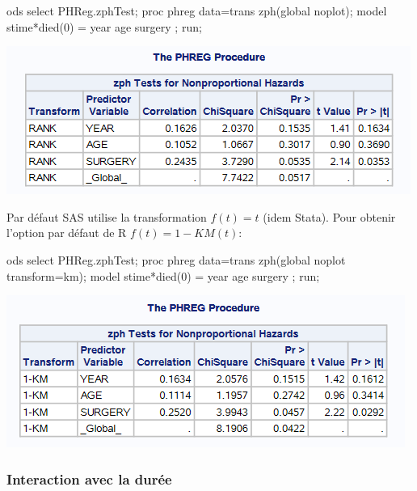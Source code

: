 \documentclass[
  12pt,
  letterpaper,
  DIV=11,
  numbers=noendperiod,
  onepage,
  openany]{scrreprt}
\newenvironment{Shaded}{\begin{snugshade}}{\end{snugshade}}
\newcommand{\AttributeTok}[1]{\textcolor[rgb]{0.80,0.80,0.80}{#1}}
\newcommand{\DecValTok}[1]{\textcolor[rgb]{0.86,0.86,0.80}{#1}}
\newcommand{\FunctionTok}[1]{\textcolor[rgb]{0.94,0.94,0.56}{#1}}
\newcommand{\NormalTok}[1]{\textcolor[rgb]{0.80,0.80,0.80}{#1}}
\newcommand{\OtherTok}[1]{\textcolor[rgb]{0.94,0.94,0.56}{#1}}
\newcommand{\SpecialCharTok}[1]{\textcolor[rgb]{0.86,0.64,0.64}{#1}}
\begin{document}
\begin{Shaded}
\begin{Highlighting}[]
\NormalTok{ods select PHReg.zphTest;}
\NormalTok{proc phreg data}\OtherTok{=}\NormalTok{trans }\FunctionTok{zph}\NormalTok{(global noplot);}
\NormalTok{model stime}\SpecialCharTok{*}\FunctionTok{died}\NormalTok{(}\DecValTok{0}\NormalTok{) }\OtherTok{=}\NormalTok{ year age surgery ;}
\NormalTok{run;}
\end{Highlighting}
\end{Shaded}

\includegraphics{sas/5b.PNG}

Par défaut SAS utilise la transformation \(f(t)=t\) (idem Stata). Pour
obtenir l'option par défaut de R \(f(t) = 1 - KM(t)\):

\begin{Shaded}
\begin{Highlighting}[]
\NormalTok{ods select PHReg.zphTest;}
\NormalTok{proc phreg data}\OtherTok{=}\NormalTok{trans }\FunctionTok{zph}\NormalTok{(global noplot }\AttributeTok{transform=}\NormalTok{km);}
\NormalTok{model stime}\SpecialCharTok{*}\FunctionTok{died}\NormalTok{(}\DecValTok{0}\NormalTok{) }\OtherTok{=}\NormalTok{ year age surgery ;}
\NormalTok{run;}
\end{Highlighting}
\end{Shaded}

\includegraphics{sas/5c.PNG}

\hypertarget{interaction-avec-la-duruxe9e}{%
\subsubsection{Interaction avec la
durée}\label{interaction-avec-la-duruxe9e}}
\end{document}
